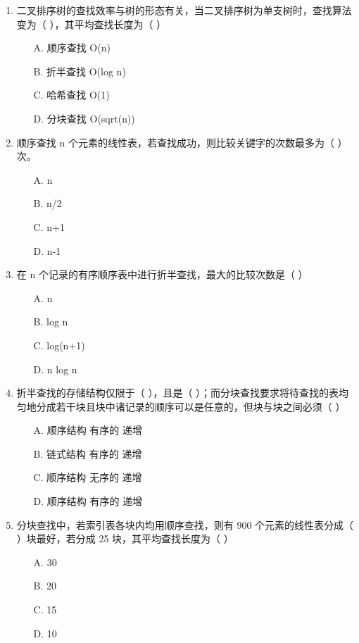 \documentclass[12pt, a4paper]{article}
\begin{document}
\begin{enumerate}[label=\arabic*.]
	\item 二叉排序树的查找效率与树的形态有关，当二叉排序树为单支树时，查找算法变为（ ），其平均查找长度为（ ）
	      \begin{enumerate}
		      \item[A.] 顺序查找 O(n)
		      \item[B.] 折半查找 O(log n)
		      \item[C.] 哈希查找 O(1)
		      \item[D.] 分块查找 O(sqrt(n))
	      \end{enumerate}

	\item 顺序查找 n 个元素的线性表，若查找成功，则比较关键字的次数最多为（ ）次。
	      \begin{enumerate}
		      \item[A.] n
		      \item[B.] n/2
		      \item[C.] n+1
		      \item[D.] n-1
	      \end{enumerate}

	\item 在 n 个记录的有序顺序表中进行折半查找，最大的比较次数是（ ）
	      \begin{enumerate}
		      \item[A.] n
		      \item[B.] log n
		      \item[C.] log(n+1)
		      \item[D.] n log n
	      \end{enumerate}

	\item 折半查找的存储结构仅限于（ ），且是（ ）；而分块查找要求将待查找的表均匀地分成若干块且块中诸记录的顺序可以是任意的，但块与块之间必须（ ）
	      \begin{enumerate}
		      \item[A.] 顺序结构 有序的 递增
		      \item[B.] 链式结构 有序的 递增
		      \item[C.] 顺序结构 无序的 递增
		      \item[D.] 顺序结构 有序的 递增
	      \end{enumerate}

	\item 分块查找中，若索引表各块内均用顺序查找，则有 900 个元素的线性表分成（ ）块最好，若分成 25 块，其平均查找长度为（ ）
	      \begin{enumerate}
		      \item[A.] 30
		      \item[B.] 20
		      \item[C.] 15
		      \item[D.] 10
	      \end{enumerate}


\end{enumerate}
\end{document}
